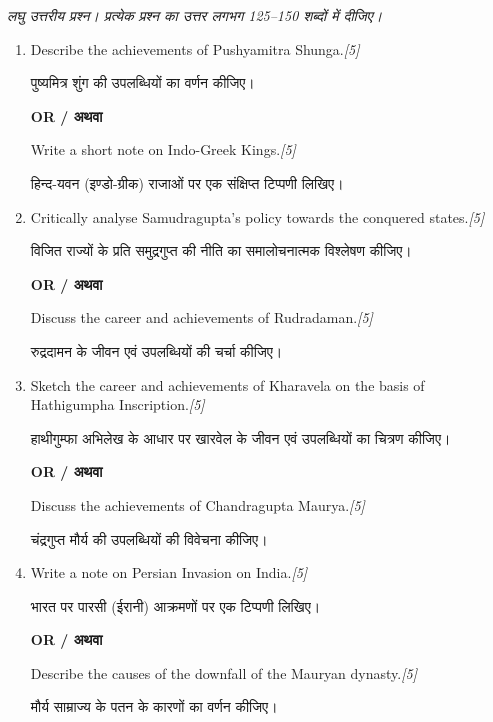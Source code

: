 \documentclass[11pt,a4paper]{article}
\newcommand{\pts}[1]{\hfill \textit{[#1]}}
\begin{document}
\noindent \textit{लघु उत्तरीय प्रश्न। प्रत्येक प्रश्न का उत्तर लगभग 125--150 शब्दों में दीजिए।}

\begin{enumerate}[label=\textbf{\arabic*.},leftmargin=*,start=4,itemsep=10pt]

  \item Describe the achievements of Pushyamitra Shunga.\pts{5}
  
  पुष्यमित्र शुंग की उपलब्धियों का वर्णन कीजिए।

  \begin{center}\textbf{OR / अथवा}\end{center}

  Write a short note on Indo-Greek Kings.\pts{5}
  
  हिन्द-यवन (इण्डो-ग्रीक) राजाओं पर एक संक्षिप्त टिप्पणी लिखिए।

  \item Critically analyse Samudragupta's policy towards the conquered states.\pts{5}
  
  विजित राज्यों के प्रति समुद्रगुप्त की नीति का समालोचनात्मक विश्लेषण कीजिए।

  \begin{center}\textbf{OR / अथवा}\end{center}

  Discuss the career and achievements of Rudradaman.\pts{5}
  
  रुद्रदामन के जीवन एवं उपलब्धियों की चर्चा कीजिए।

  \item Sketch the career and achievements of Kharavela on the basis of Hathigumpha Inscription.\pts{5}
  
  हाथीगुम्फा अभिलेख के आधार पर खारवेल के जीवन एवं उपलब्धियों का चित्रण कीजिए।

  \begin{center}\textbf{OR / अथवा}\end{center}

  Discuss the achievements of Chandragupta Maurya.\pts{5}
  
  चंद्रगुप्त मौर्य की उपलब्धियों की विवेचना कीजिए।

  \item Write a note on Persian Invasion on India.\pts{5}
  
  भारत पर पारसी (ईरानी) आक्रमणों पर एक टिप्पणी लिखिए।

  \begin{center}\textbf{OR / अथवा}\end{center}

  Describe the causes of the downfall of the Mauryan dynasty.\pts{5}
  
  मौर्य साम्राज्य के पतन के कारणों का वर्णन कीजिए।

\end{enumerate}
\end{document}
